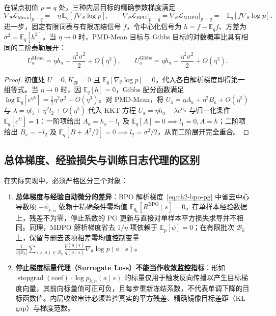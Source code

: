 \documentclass[lang=cn,scheme=chinese,openany]{elegantbook}
\newcommand{\E}{\mathbb E}
\newcommand{\sg}{\operatorname{stopgrad}}
\begin{document}
\begin{proposition}
\label{prop:ch2-eta-initial-scale}
在锚点初值 $p=q$ 处，三种内层目标的精确参数梯度满足
\begin{equation*}
 \nabla_\theta\mathcal L_{\mathrm{Mean}}\big|_{p=q}
 =-\eta\,\mathbb E_q[f\nabla_\theta\log p],\qquad
 \nabla_\theta\mathcal L_{\mathrm{BPO}}\big|_{p=q}
 =\nabla_\theta\mathcal L_{\mathrm{MDPO}}\big|_{p=q}
 =-\mathbb E_q[f\nabla_\theta\log p].
\end{equation*}
进一步，固定有限词表与有限冻结信号 $f$，令中心化信号为 $h=f-\mathbb E_q f$、方差为 $\sigma^2=\mathbb E_q[h^2]$。当 $\eta\to0$ 时，PMD-Mean 目标与 Gibbs 目标的对数概率比具有相同的二阶泰勒展开：
\begin{equation*}
 U_a^{\mathrm{Mean}}=\eta h_a-\frac{\eta^2\sigma^2}{2}+O(\eta^3),\qquad
 U_a^{\mathrm{Gibbs}}=\eta h_a-\frac{\eta^2\sigma^2}{2}+O(\eta^3).
\end{equation*}
\end{proposition}
\begin{proof}
初值处 $U=0, K_{qp}=0$ 且 $\mathbb E_q[\nabla_\theta\log p]=0$，代入各自解析梯度即得第一组等式。当 $\eta\to 0$ 时，因 $\mathbb E_q[h]=0$，Gibbs 配分函数满足 $\log\mathbb E_q[e^{\eta h}]=\frac12\eta^2\sigma^2+O(\eta^3)$。对 PMD-Mean，将 $U_a=\eta A_a+\eta^2 B_a+O(\eta^3)$ 与 $\lambda=\eta l_1+\eta^2 l_2+O(\eta^3)$ 代入 KKT 方程 $U_a=\eta h_a-\lambda e^{U_a}$ 与归一化条件 $\E_q[e^U]=1$：一阶项给出 $A_a=h_a-l_1$ 及 $\E_q[A]=0\implies l_1=0, A=h$；二阶项给出 $B_a=-l_2$ 及 $\E_q[B+A^2/2]=0\implies l_2=\sigma^2/2$，从而二阶展开完全重合。
\end{proof}

\subsection{总体梯度、经验损失与训练日志代理的区别}
\label{subsec:ch2-population-empirical-surrogate}

在实际实现中，必须严格区分三个对象：
\begin{enumerate}
\item \textbf{总体梯度与经验自动微分的差异}：BPO 解析梯度~\eqref{eq:ch2-bpo-pg} 中省去中心导数项 $-\bar\psi_{k,n}$ 依赖于精确条件零均值 $\mathbb E_{q_k}[R^{\mathrm{BPO}}\mid s]=0$。在单样本经验数据上，残差不为零，停止系数的 PG 更新与直接对单样本平方损失求导并不相同。同理，MDPO 解析梯度省去 $1/\eta$ 项依赖于 $\mathbb E_p[\psi]=0$；在有限批次 $\mathcal B_k$ 上，保留与删去该项相差零均值控制变量 $\frac{1}{\eta|\mathcal B_k|}\sum_{(s,a)\in\mathcal B_k}\frac{p(a\mid s)}{q(a\mid s)}\nabla_\theta\log p(a\mid s)$。
\item \textbf{停止梯度标量代理（Surrogate Loss）不能当作收敛监控指标}：形如 $\sg(\text{coef})\cdot\log p_{k,n}(a\mid s)$ 的标量仅用于触发反向传播以产生目标梯度向量，其前向标量值可正可负，且每步重新冻结系数，不代表单调下降的目标函数值。内层收敛审计必须监控真实的平方残差、精确镜像目标差距（KL gap）与梯度范数。
\end{enumerate}
\end{document}
